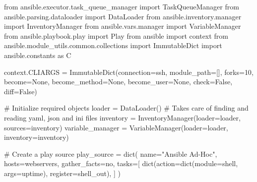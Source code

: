 \documentclass[
  letterpaper,
  DIV=11,
  numbers=noendperiod]{scrreprt}
\newenvironment{Shaded}{\begin{snugshade}}{\end{snugshade}}
\newcommand{\BuiltInTok}[1]{\textcolor[rgb]{0.00,0.23,0.31}{#1}}
\newcommand{\CommentTok}[1]{\textcolor[rgb]{0.37,0.37,0.37}{#1}}
\newcommand{\DecValTok}[1]{\textcolor[rgb]{0.68,0.00,0.00}{#1}}
\newcommand{\ImportTok}[1]{\textcolor[rgb]{0.00,0.46,0.62}{#1}}
\newcommand{\NormalTok}[1]{\textcolor[rgb]{0.00,0.23,0.31}{#1}}
\newcommand{\OperatorTok}[1]{\textcolor[rgb]{0.37,0.37,0.37}{#1}}
\newcommand{\StringTok}[1]{\textcolor[rgb]{0.13,0.47,0.30}{#1}}
\newcommand{\VariableTok}[1]{\textcolor[rgb]{0.07,0.07,0.07}{#1}}
\begin{document}
\begin{Shaded}
\begin{Highlighting}[]
\ImportTok{from}\NormalTok{ ansible.executor.task\_queue\_manager }\ImportTok{import}\NormalTok{ TaskQueueManager}
\ImportTok{from}\NormalTok{ ansible.parsing.dataloader }\ImportTok{import}\NormalTok{ DataLoader}
\ImportTok{from}\NormalTok{ ansible.inventory.manager }\ImportTok{import}\NormalTok{ InventoryManager}
\ImportTok{from}\NormalTok{ ansible.}\BuiltInTok{vars}\NormalTok{.manager }\ImportTok{import}\NormalTok{ VariableManager}
\ImportTok{from}\NormalTok{ ansible.playbook.play }\ImportTok{import}\NormalTok{ Play}
\ImportTok{from}\NormalTok{ ansible }\ImportTok{import}\NormalTok{ context}
\ImportTok{from}\NormalTok{ ansible.module\_utils.common.collections }\ImportTok{import}\NormalTok{ ImmutableDict}
\ImportTok{import}\NormalTok{ ansible.constants }\ImportTok{as}\NormalTok{ C}

\NormalTok{context.CLIARGS }\OperatorTok{=}\NormalTok{ ImmutableDict(connection}\OperatorTok{=}\StringTok{\textquotesingle{}ssh\textquotesingle{}}\NormalTok{, module\_path}\OperatorTok{=}\NormalTok{[], forks}\OperatorTok{=}\DecValTok{10}\NormalTok{, become}\OperatorTok{=}\VariableTok{None}\NormalTok{, become\_method}\OperatorTok{=}\VariableTok{None}\NormalTok{, become\_user}\OperatorTok{=}\VariableTok{None}\NormalTok{, check}\OperatorTok{=}\VariableTok{False}\NormalTok{, diff}\OperatorTok{=}\VariableTok{False}\NormalTok{)}

\CommentTok{\# Initialize required objects}
\NormalTok{loader }\OperatorTok{=}\NormalTok{ DataLoader()  }\CommentTok{\# Takes care of finding and reading yaml, json and ini files}
\NormalTok{inventory }\OperatorTok{=}\NormalTok{ InventoryManager(loader}\OperatorTok{=}\NormalTok{loader, sources}\OperatorTok{=}\StringTok{\textquotesingle{}inventory\textquotesingle{}}\NormalTok{)}
\NormalTok{variable\_manager }\OperatorTok{=}\NormalTok{ VariableManager(loader}\OperatorTok{=}\NormalTok{loader, inventory}\OperatorTok{=}\NormalTok{inventory)}

\CommentTok{\# Create a play source}
\NormalTok{play\_source }\OperatorTok{=} \BuiltInTok{dict}\NormalTok{(}
\NormalTok{    name}\OperatorTok{=}\StringTok{"Ansible Ad{-}Hoc"}\NormalTok{,}
\NormalTok{    hosts}\OperatorTok{=}\StringTok{\textquotesingle{}webservers\textquotesingle{}}\NormalTok{,}
\NormalTok{    gather\_facts}\OperatorTok{=}\StringTok{\textquotesingle{}no\textquotesingle{}}\NormalTok{,}
\NormalTok{    tasks}\OperatorTok{=}\NormalTok{[}
        \BuiltInTok{dict}\NormalTok{(action}\OperatorTok{=}\BuiltInTok{dict}\NormalTok{(module}\OperatorTok{=}\StringTok{\textquotesingle{}shell\textquotesingle{}}\NormalTok{, args}\OperatorTok{=}\StringTok{\textquotesingle{}uptime\textquotesingle{}}\NormalTok{), register}\OperatorTok{=}\StringTok{\textquotesingle{}shell\_out\textquotesingle{}}\NormalTok{),}
\NormalTok{    ]}
\NormalTok{)}


\end{Highlighting}
\end{Shaded}
\end{document}
